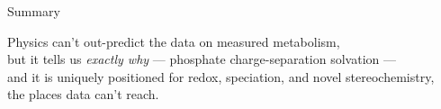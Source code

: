 \documentclass[aspectratio=169,11pt]{beamer}
\newcommand{\good}[1]{\textcolor{good}{#1}}
\begin{document}
\begin{frame}{Summary}
  \begin{center}
  \large
  Physics can't out-predict the data on measured metabolism,\\[0.4em]
  but it tells us \good{\emph{exactly why}} --- phosphate charge-separation
  solvation ---\\[0.4em]
  and it is uniquely positioned for \good{redox, speciation, and novel
  stereochemistry},\\[0.4em]
  the places data can't reach.
  \end{center}
\end{frame}
\end{document}
